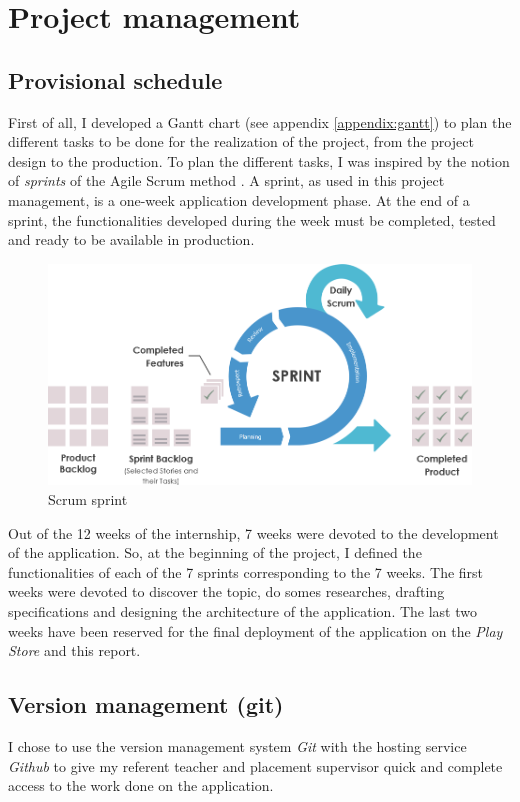 \section{Project management}

\subsection{Provisional schedule}
First of all, I developed a Gantt chart (see appendix \ref{appendix:gantt}) to plan the different tasks to be done for the realization of the project, from the project design to the production. To plan the different tasks, I was inspired by the notion of \textit{sprints} of the Agile Scrum method \cite{scrum}. A sprint, as used in this project management, is a one-week application development phase. At the end of a sprint, the functionalities developed during the week must be completed, tested and ready to be available in production.

\begin{figure}
  \includegraphics[width=.7\linewidth]{content/imgs/scrum_sprint.png}
  \caption{Scrum sprint}
\end{figure}

Out of the 12 weeks of the internship, 7 weeks were devoted to the development of the application. So, at the beginning of the project, I defined the functionalities of each of the 7 sprints corresponding to the 7 weeks. The first weeks were devoted to discover the topic, do somes researches, drafting specifications and designing the architecture of the application. The last two weeks have been reserved for the final deployment of the application on the \textit{Play Store} and this report.



\subsection{Version management (git)}

I chose to use the version management system \textit{Git} with the hosting service \textit{Github} to give my referent teacher and placement supervisor quick and complete access to the work done on the application.

